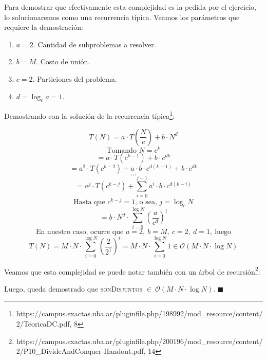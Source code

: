 \documentclass[10pt, a4paper]{article}
\newcommand{\bigO}{\mathcal{O}}
\begin{document}
Para demostrar que efectivamente esta complejidad es la pedida por el ejercicio, lo solucionaremos como una recurrencia t\'ipica.
Veamos los par\'ametros que requiere la demostraci\'on:
\begin{enumerate}
  \item $a = 2$. Cantidad de subproblemas a resolver.
  \item $b = M.$ Costo de uni\'on.
  \item $c = 2$. Particiones del problema.
  \item $d = \log_{c} a = 1$.
\end{enumerate}
Demostrando con la soluci\'on de la recurrencia t\'ipica\footnote{https://campus.exactas.uba.ar/pluginfile.php/198992/mod\_resource/content/2/TeoricaDC.pdf, 8}: %

\[ T(N) = a \cdot T(\frac{N}{c}) + b \cdot N^{d} \]
\[ \text{Tomando } N = c^{k} \]
\[ = a \cdot T(c^{k-1}) + b \cdot c^{dk} \]
\[ = a^{2} \cdot T(c^{k-2}) + a \cdot b \cdot c^{d(k - 1)} + b \cdot c^{dk} \]
\[ ... \]
\[ = a^{j} \cdot T(c^{k - j}) + \sum_{i=0}^{j - 1} a^{i} \cdot b \cdot c^{d(k - i)} \]
\[ \text{Hasta que } c^{k - j} = 1 \text{, o sea, } j = \log_{c} N \]
\[ = b \cdot N^{d} \cdot \sum_{i=0}^{\log N} \left(\frac{a}{c^d}\right)^{i} \]
\[ \text{En nuestro caso, ocurre que } a = 2,\ b = M,\ c = 2,\ d = 1,\ \text{luego} \]
\[ T(N) =  M \cdot N \cdot \sum_{i=0}^{\log N} \left(\frac{2}{2^1}\right)^{i} = M \cdot N \cdot \sum_{i=0}^{\log N} 1 \in \bigO(M \cdot N \cdot \log N) \]

Veamos que esta complejidad se puede notar tambi\'en con un \'arbol de recursi\'on\footnote{https://campus.exactas.uba.ar/pluginfile.php/200196/mod\_resource/content/2/P10\_DivideAndConquer-Handout.pdf, 14}:

\begin{center}
  \scalebox{0.8}{}
\end{center}

Luego, queda demostrado que \textsc{sonDisjuntos} $\in \ \bigO(M \cdot N \cdot \log N)$. $\blacksquare$

\vspace{0.5em}
\end{document}
